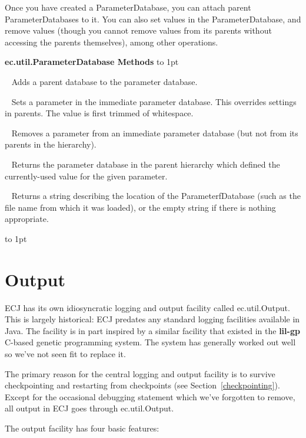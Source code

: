 \documentclass[twoside,10pt]{book}
\newcommand\class[1]{\index{#1}\textsf{#1}}
\newcommand*{\xfill}[1][0pt]{%
	\cleaders
		\hbox to 1pt{\hss
			\raisebox{#1}{\rule{1.2pt}{0.4pt}}%
			\hss}\hfill}
\newenvironment{methods}[1]{
\vspace{1.0em}\noindent\textsf{\textbf{#1 Methods}}\quad \xfill[0.5ex]
\vspace{-0.25em}
\begin{description}
\small}
{\end{description}\vspace{-0.5em}\rule{0pt}{0pt}\xfill[0ex]\vspace{1em}}
\newcommand{\mthd}[1]{\item[{\sf #1}]~\newline}
\begin{document}
Once you have created a ParameterDatabase, you can attach parent ParameterDatabases to it.  You can also set values in the ParameterDatabase, and remove values (though you cannot remove values from its parents without accessing the parents themselves), among other operations.

\begin{methods}{ec.util.ParameterDatabase}
\mthd{public void addParent(ParameterDatabase database)}
Adds a parent database to the parameter database.
\mthd{public void set(Parameter parameter, String value)}
Sets a parameter in the immediate parameter database.  This overrides settings in parents.  The value is first trimmed of whitespace.
\mthd{public void remove(Parameter parameter)}
Removes a parameter from an immediate parameter database (but not from its parents in the hierarchy).
\mthd{public ParameterDatabase getLocation(Parameter parameter)}
Returns the parameter database in the parent hierarchy which defined the currently-used value for the given parameter.
\mthd{public String getLabel()}
Returns a string describing the location of the ParameterfDatabase (such as the file name from which it was loaded), or the empty string if there is nothing appropriate.
\end{methods}

\section{Output}
\label{ec.util.Output}

ECJ has its own idiosyncratic logging and output facility called \class{ec.util.Output}.  This is largely historical: ECJ predates any standard logging facilities available in Java.  The facility is in part inspired by a similar facility that existed in the {\bf lil-gp} C-based genetic programming system.  The system has generally worked out well so we've not seen fit to replace it.

The primary reason for the central logging and output facility is to survive checkpointing and restarting from checkpoints (see Section~\ref{checkpointing}).  Except for the occasional debugging statement which we've forgotten to remove, all output in ECJ goes through \class{ec.util.Output}.

The output facility has four basic features:
\end{document}
